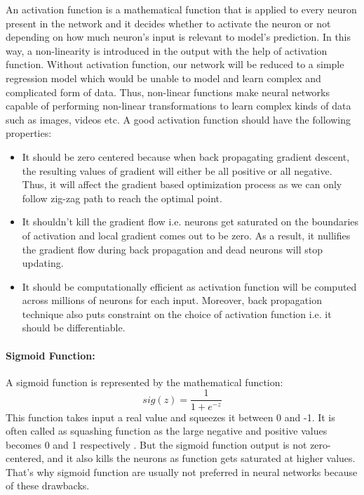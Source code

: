 An activation function is a mathematical function that is applied  to every neuron present in the network and it decides whether to activate the neuron 
or not depending on how much neuron’s input is relevant to model’s prediction. 
In this way, a non-linearity is introduced in the output with the help of activation function. Without activation function, our network will be reduced to a simple 
regression model which would be unable to model and learn complex and complicated 
form of data. Thus, non-linear functions make neural networks capable 
of performing non-linear transformations to learn complex kinds of data such 
as 	images, videos etc. A good activation 
function should have the following properties:
\begin{itemize}
\item It should be zero centered because when back propagating gradient descent, the resulting values of gradient will either be all positive or all negative. Thus, it will affect the gradient based optimization process as we can only follow zig-zag path to reach the optimal point.
\item It shouldn’t kill the gradient flow i.e. neurons get saturated on the boundaries of activation and local gradient comes out to be zero. As a result, it nullifies the gradient flow during back propagation and dead neurons will stop updating.
\item It should be computationally efficient as activation function will be computed across millions of neurons for each input. Moreover, back propagation technique also puts constraint on the choice of activation function i.e. it should be differentiable.

\end{itemize}

\paragraph*{Sigmoid Function:}
A sigmoid function is represented by the mathematical function:
\begin{equation}
	sig(z) = \frac{1}{1+e^{-z}}
\end{equation}
This function takes input a real value and squeezes 
it between 0 and -1. It is often called
as squashing function as the large negative and positive 
values becomes 0 and 1 respectively \cite{chap_3_article:5} . But the sigmoid function 
output is not zero-centered, and it also kills the neurons as function 
gets saturated at higher values. That’s why sigmoid function are usually 
not preferred in neural networks because of these drawbacks.

